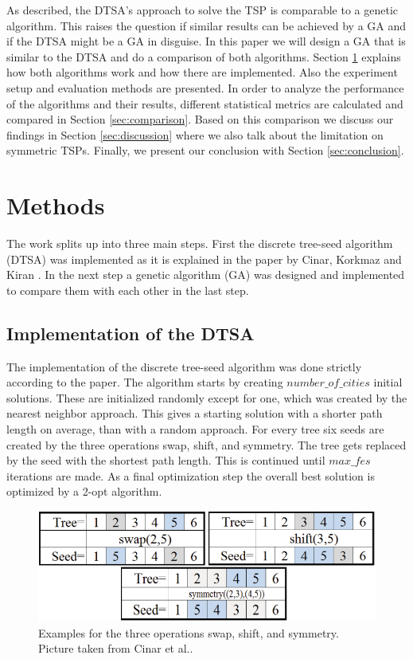 \documentclass[12pt]{article}
\theoremstyle{plain}
\theoremstyle{definition}
\theoremstyle{remark}
\begin{document}
As described, the DTSA's approach to solve the TSP is comparable to a genetic algorithm.
This raises the question if similar results can be achieved by a GA and if the DTSA might be a GA in disguise.
In this paper we will design a GA that is similar to the DTSA and do a comparison of both algorithms.
Section \ref{sec:methods} explains how both algorithms work and how there are implemented.
Also the experiment setup and evaluation methods are presented.
In order to analyze the performance of the algorithms and their results, different statistical metrics are calculated and compared in Section \ref{sec:comparison}.
Based on this comparison we discuss our findings in Section \ref{sec:discussion} where we also talk about the limitation on symmetric TSPs.
Finally, we present our conclusion with Section \ref{sec:conclusion}.

\section{Methods}
\label{sec:methods}

The work splits up into three main steps.
First the discrete tree-seed algorithm (DTSA) was implemented as it is explained in the paper by Cinar, Korkmaz and Kiran \cite{cinar20}.
In the next step a genetic algorithm (GA) was designed and implemented to compare them with each other in the last step.

\subsection{Implementation of the DTSA}

The implementation of the discrete tree-seed algorithm was done strictly according to the paper.
The algorithm starts by creating $number\_of\_cities$ initial solutions.
These are initialized randomly except for one, which was created by the nearest neighbor approach\cite{Langley93}.
This gives a starting solution with a shorter path length on average, than with a random approach.
For every tree six seeds are created by the three operations swap, shift, and symmetry.
The tree gets replaced by the seed with the shortest path length.
This is continued until $max\_fes$ iterations are made.
As a final optimization step the overall best solution is optimized by a 2-opt algorithm.

\begin{figure}[ht]
    \centering
    \includegraphics[scale = 0.55]{operations}
    \caption{Examples for the three operations swap, shift, and symmetry. Picture taken from Cinar et al.\cite{cinar20}.}
    \label{fig:operations}
\end{figure}
\end{document}
